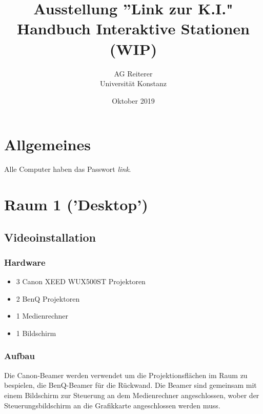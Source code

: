 \documentclass [titlepage,a4paper]{article}
\title{Ausstellung ''Link zur K.I."\\
Handbuch Interaktive Stationen\\
(WIP)}
\author{
    AG Reiterer\\
    Universität Konstanz
}
\date{Oktober 2019}
\begin{document}
\begin{titlepage}
\maketitle
\end{titlepage}



\tableofcontents

\pagebreak

\listoffigures 

\pagebreak


\section{Allgemeines}

Alle Computer haben das Passwort \textit{link}.

\newpage
\section{Raum 1 ('Desktop')}

\subsection{Videoinstallation}

\subsubsection{Hardware}

\begin{itemize}
\item 3 Canon XEED WUX500ST Projektoren
\item 2 BenQ Projektoren
\item 1 Medienrechner
\item 1 Bildschirm
\end{itemize}

\subsubsection{Aufbau}

Die Canon-Beamer werden verwendet um die Projektionsflächen im Raum zu bespielen, die BenQ-Beamer für die Rückwand. Die Beamer sind gemeinsam mit einem Bildschirm zur Steuerung an dem Medienrechner angeschlossen, wober der Steuerungsbildschirm an die Grafikkarte angeschlossen werden muss.
\end{document}
